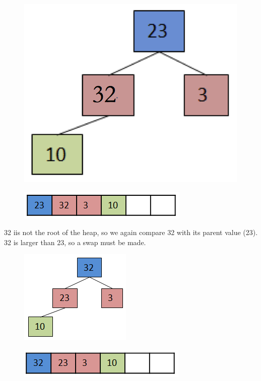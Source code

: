 \begin{figure}[H]
\centering
\includegraphics{pictures/heap6.png}
\label{fig:heap6}
\end{figure}

\begin{figure}[H]
\centering
\includegraphics{pictures/heap6a.png}
\label{fig:heap6a}
\end{figure}

32 iis not the root of the heap, so we again compare 32  with its parent value (23).   32 is larger than 23, so a swap must be made.

\begin{figure}[H]
\centering
\includegraphics{pictures/heap7.png}
\label{fig:heap7}
\end{figure}

\begin{figure}[H]
\centering
\includegraphics{pictures/heap7a.png}
\label{fig:heap7a}
\end{figure}

